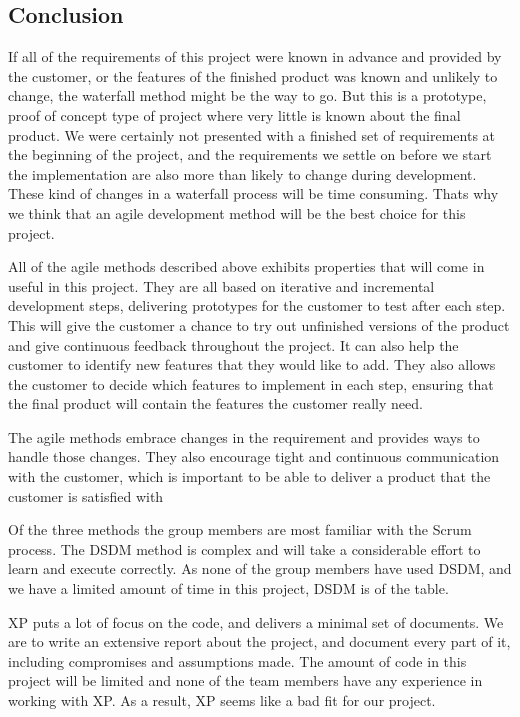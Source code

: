 \subsection{Conclusion}
If all of the requirements of this project were known in advance and provided by the customer, or the features of the finished product was known and unlikely to change, the waterfall method might be the way to go. But this is a prototype, proof of concept type of project where very little is known about the final product. We were certainly not presented with a finished set of requirements at the beginning of the project, and the requirements we settle on before we start the implementation are also more than likely to change during development. These kind of changes in a waterfall process will be time consuming. Thats why we think that an agile development method will be the best choice for this project.

All of the agile methods described above exhibits properties that will come in useful in this project. They are all based on iterative and incremental development steps, delivering prototypes for the customer to test after each step. This will give the customer a chance to try out unfinished versions of the product and give continuous feedback throughout the project. It can also help the customer to identify new features that they would like to add. They also allows the customer to decide which features to implement in each step, ensuring that the final product will contain the features the customer really need.

The agile methods embrace changes in the requirement and provides ways to handle those changes. They also encourage tight and continuous communication with the customer, which is important to be able to deliver a product that the customer is satisfied with

Of the three methods the group members are most familiar with the Scrum process. The DSDM method is complex and will take a considerable effort to learn and execute correctly. As none of the group members have used DSDM, and we have a limited amount of time in this project, DSDM is of the table. 

XP puts a lot of focus on the code, and delivers a minimal set of documents. We are to write an extensive report about the project, and document every part of it, including compromises and assumptions made. The amount of code in this project will be limited and none of the team members have any experience in working with XP. As a result, XP seems like a bad fit for our project.

